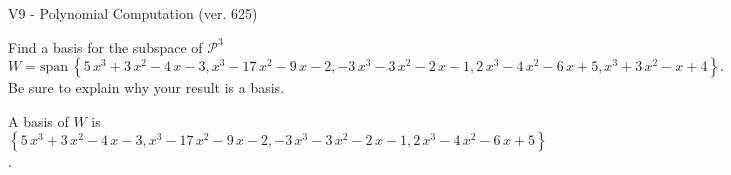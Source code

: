\begin{exercise}
  \begin{exerciseTitle}V9 - Polynomial Computation (ver. 625)\end{exerciseTitle}
  \begin{exerciseStatement}
    Find a basis for the subspace of \(\mathcal{P}^3\) 
\[W=\mathrm{span}\ \left\{5 \, x^{3} + 3 \, x^{2} - 4 \, x - 3 , x^{3} - 17 \, x^{2} - 9 \, x - 2 , -3 \, x^{3} - 3 \, x^{2} - 2 \, x - 1 , 2 \, x^{3} - 4 \, x^{2} - 6 \, x + 5 , x^{3} + 3 \, x^{2} - x + 4\right\}.\]
 Be sure to explain why your result is a basis.


  \end{exerciseStatement}
  \begin{exerciseAnswer}
   A basis of \(W\) is  \(\left\{5 \, x^{3} + 3 \, x^{2} - 4 \, x - 3 , x^{3} - 17 \, x^{2} - 9 \, x - 2 , -3 \, x^{3} - 3 \, x^{2} - 2 \, x - 1 , 2 \, x^{3} - 4 \, x^{2} - 6 \, x + 5\right\}\).
  


  \end{exerciseAnswer}
\end{exercise}